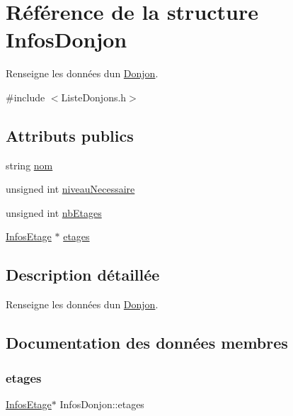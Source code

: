 \hypertarget{structInfosDonjon}{}\section{Référence de la structure Infos\+Donjon}
\label{structInfosDonjon}


Renseigne les données d\textquotesingle{}un \mbox{\hyperlink{classDonjon}{Donjon}}.  




{\ttfamily \#include $<$Liste\+Donjons.\+h$>$}

\subsection*{Attributs publics}
\begin{DoxyCompactItemize}
\item 
string \mbox{\hyperlink{structInfosDonjon_a3ea4290a0982ad105087f446d3472b28}{nom}}
\item 
unsigned int \mbox{\hyperlink{structInfosDonjon_a706c7d2087a2953bf35805fd76ade537}{niveau\+Necessaire}}
\item 
unsigned int \mbox{\hyperlink{structInfosDonjon_a19821da1e65faf7374033b20e9d65170}{nb\+Etages}}
\item 
\mbox{\hyperlink{structInfosEtage}{Infos\+Etage}} $\ast$ \mbox{\hyperlink{structInfosDonjon_ace019f580195b10cf59ab7189392ec3a}{etages}}
\end{DoxyCompactItemize}


\subsection{Description détaillée}
Renseigne les données d\textquotesingle{}un \mbox{\hyperlink{classDonjon}{Donjon}}. 

\subsection{Documentation des données membres}
\mbox{\label{structInfosDonjon_ace019f580195b10cf59ab7189392ec3a}} 
\subsubsection{\texorpdfstring{etages}{etages}}
{\footnotesize\ttfamily \mbox{\hyperlink{structInfosEtage}{Infos\+Etage}}$\ast$ Infos\+Donjon\+::etages}

